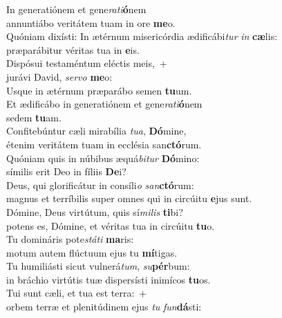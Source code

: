 \evenverse In generatiónem et gene\textit{ra}\textit{ti}\textbf{ó}nem~\*\\
\evenverse annuntiábo veritátem tuam in ore \textbf{me}o.\\
\oddverse Quóniam dixísti: In ætérnum misericórdia ædificábi\textit{tur} \textit{in} \textbf{cæ}lis:~\*\\
\oddverse præparábitur véritas tua in \textbf{e}is.\\
\evenverse Dispósui testaméntum eléctis meis,~+\\
\evenverse  jurávi David, \textit{ser}\textit{vo} \textbf{me}o:~\*\\
\evenverse Usque in ætérnum præparábo semen \textbf{tu}um.\\
\oddverse Et ædificábo in generatiónem et gene\textit{ra}\textit{ti}\textbf{ó}nem~\*\\
\oddverse sedem \textbf{tu}am.\\
\evenverse Confitebúntur cæli mirabília \textit{tu}\textit{a}, \textbf{Dó}mine,~\*\\
\evenverse étenim veritátem tuam in ecclésia san\textbf{ctó}rum.\\
\oddverse Quóniam quis in núbibus æquá\textit{bi}\textit{tur} \textbf{Dó}mino:~\*\\
\oddverse símilis erit Deo in fíliis \textbf{De}i?\\
\evenverse Deus, qui glorificátur in consíli\textit{o} \textit{san}\textbf{ctó}rum:~\*\\
\evenverse magnus et terríbilis super omnes qui in circúitu \textbf{e}jus sunt.\\
\oddverse Dómine, Deus virtútum, quis sí\textit{mi}\textit{lis} \textbf{ti}bi?~\*\\
\oddverse potens es, Dómine, et véritas tua in circúitu \textbf{tu}o.\\
\evenverse Tu domináris pote\textit{stá}\textit{ti} \textbf{ma}ris:~\*\\
\evenverse motum autem flúctuum ejus tu \textbf{mí}tigas.\\
\oddverse Tu humiliásti sicut vulnerá\textit{tum}, \textit{su}\textbf{pér}bum:~\*\\
\oddverse in bráchio virtútis tuæ dispersísti inimícos \textbf{tu}os.\\
\evenverse Tui sunt cæli, et tua est terra:~+\\
\evenverse  orbem terræ et plenitúdinem ejus \textit{tu} \textit{fun}\textbf{dá}sti:~\*\\
